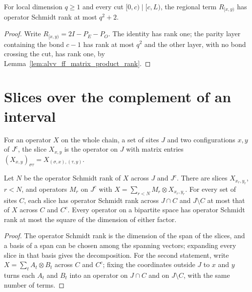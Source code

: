 \begin{lemma}
    \label{lem:alvv_ff_family_region_rank}
    \leanok
    For local dimension $q\ge1$ and every cut $[0,c)\mid[c,L)$, the regional
    term $R_{[x,y)}$ has operator Schmidt rank at most $q^2+2$.
\end{lemma}
\begin{proof}\leanok
    Write $R_{[x,y)}=2I-P_E-P_O$. The identity has rank one; the parity layer
    containing the bond $c-1$ has rank at most $q^2$ and the other layer, with no
    bond crossing the cut, has rank one, by
    Lemma~\ref{lem:alvv_ff_matrix_product_rank}.
\end{proof}

\section{Slices over the complement of an interval}

\begin{definition}
    \label{def:alvv_ff_family_slice}
    \leanok
    For an operator $X$ on the whole chain, a set of sites $J$ and two
    configurations $x,y$ of $J^c$, the slice $X_{x,y}$ is the operator on $J$
    with matrix entries $(X_{x,y})_{\sigma\tau}=X_{(\sigma,x),(\tau,y)}$.
\end{definition}

\begin{lemma}
    \label{lem:alvv_ff_family_slices}
    \leanok
    Let $N$ be the operator Schmidt rank of $X$ across $J$ and $J^c$. There are
    slices $X_{x_r,y_r}$, $r<N$, and operators $M_r$ on $J^c$ with
    $X=\sum_{r<N}M_r\otimes X_{x_r,y_r}$. For every set of sites $C$, each
    slice has operator Schmidt rank across $J\cap C$ and $J\setminus C$ at most
    that of $X$ across $C$ and $C^c$. Every operator on a bipartite space has
    operator Schmidt rank at most the square of the dimension of either factor.
\end{lemma}
\begin{proof}\leanok
    The operator Schmidt rank is the dimension of the span of the slices, and
    a basis of a span can be chosen among the spanning vectors; expanding
    every slice in that basis gives the decomposition. For the second
    statement, write $X=\sum_tA_t\otimes B_t$ across $C$ and $C^c$; fixing
    the coordinates outside $J$ to $x$ and $y$ turns each $A_t$ and $B_t$ into
    an operator on $J\cap C$ and on $J\setminus C$, with the same number of
    terms.
\end{proof}

